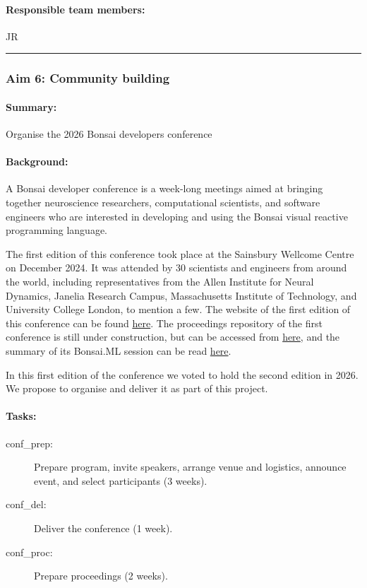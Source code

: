 \paragraph{Responsible team members:} JR

\noindent\rule{\textwidth}{1pt}
\subsubsection{Aim 6: Community building}
\paragraph{Summary:} Organise the 2026 Bonsai developers conference

\paragraph{Background:} A Bonsai developer conference is a week-long
meetings aimed at bringing together neuroscience researchers, computational
scientists, and software engineers who are interested in developing and using
the Bonsai visual reactive programming language.

The first edition of this conference took place at the Sainsbury Wellcome
Centre on December 2024. It was attended by 30 scientists and engineers from
around the world, including representatives from the Allen Institute for Neural
Dynamics, Janelia Research Campus, Massachusetts Institute of Technology, and
University College London, to mention a few.
%
The website of the first edition of this conference  can be found
\href{https://conference.bonsai-rx.org/2024/}{here}.  The proceedings
repository of the first conference is still under construction, but can be
accessed from
\href{https://github.com/joacorapela/bonsaiConference2024Proceedings}{here},
and the summary of its Bonsai.ML session can be read
\href{https://github.com/joacorapela/bonsaiConference2024Proceedings/blob/master/sessions/machineLearning/README.md}{here}.

In this first edition of the conference we voted to hold the second edition in
2026. We propose to organise and deliver it as part of this project.

\paragraph{Tasks:}  

\begin{description}
    \item[conf\_prep:] Prepare program, invite speakers, arrange venue and logistics, announce event, and select participants (3 weeks).  
    \item[conf\_del:] Deliver the conference (1 week).  
    \item[conf\_proc:] Prepare proceedings (2 weeks).  
\end{description}  

